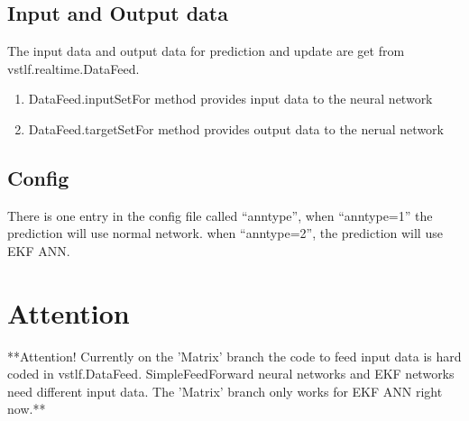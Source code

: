 \documentclass[letterpaper]{article}
\begin{document}
\subsection{Input and Output data}
The input data and output data for prediction and update are get from vstlf.realtime.DataFeed.
\begin{enumerate}
  \item DataFeed.inputSetFor method provides input data to the neural network
  \item DataFeed.targetSetFor method provides output data to the nerual network
\end{enumerate}


\subsection{Config}
There is one entry in the config file called ``anntype'', when ``anntype=1'' the prediction will use normal network. when ``anntype=2'', the prediction will use EKF ANN.

\section{Attention}
**Attention! Currently on the 'Matrix' branch the code to feed input data is hard coded in vstlf.DataFeed. SimpleFeedForward neural networks and EKF networks need different input data. The 'Matrix' branch only works for EKF ANN right now.**
\end{document}
